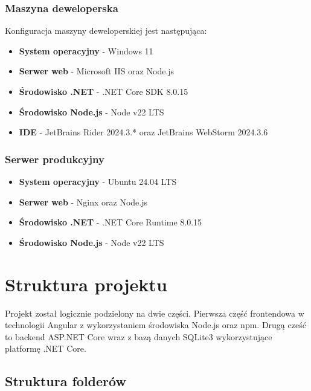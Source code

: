 \subsubsection{Maszyna deweloperska}
Konfiguracja maszyny deweloperskiej jest następująca:
\begin{itemize}
	\item \textbf{System operacyjny} - Windows 11
	\item \textbf{Serwer web} - Microsoft IIS oraz Node.js
	\item \textbf{Środowisko .NET} - .NET Core SDK 8.0.15
	\item \textbf{Środowisko Node.js} - Node v22 LTS
	\item \textbf{IDE} - JetBrains Rider 2024.3.* oraz JetBrains WebStorm 2024.3.6
\end{itemize}

\subsubsection{Serwer produkcyjny}
\begin{itemize}
	\item \textbf{System operacyjny} - Ubuntu 24.04 LTS
	\item \textbf{Serwer web} - Nginx oraz Node.js
	\item \textbf{Środowisko .NET} - .NET Core Runtime 8.0.15
	\item \textbf{Środowisko Node.js} - Node v22 LTS
\end{itemize}

\section{Struktura projektu}

Projekt został logicznie podzielony na dwie części. Pierwsza część frontendowa w technologii Angular z wykorzystaniem środowiska Node.js oraz npm. Drugą cześć to backend ASP.NET Core wraz z bazą danych SQLite3 wykorzystujące platformę .NET Core.

\subsection{Struktura folderów}

